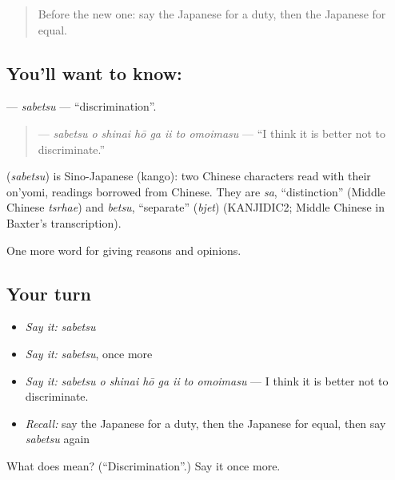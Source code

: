 \begin{quote}
Before the new one: say the Japanese for a duty, then the Japanese for equal.
\end{quote}

\subsection*{You'll want to know: }
\textbf{} — \emph{sabetsu} — \textquotedblleft{}discrimination\textquotedblright{}.

\begin{quote}
\textbf{    } — \emph{sabetsu o shinai hō ga ii to omoimasu} — \textquotedblleft{}I think it is better not to discriminate.\textquotedblright{}
\end{quote}

\begin{cousinweb}
\textbf{} (\emph{sabetsu}) is Sino-Japanese (kango): two Chinese characters read with their on'yomi, readings borrowed from Chinese. They are \emph{sa}, \textquotedblleft{}distinction\textquotedblright{} (Middle Chinese \emph{tsrhae}) and \emph{betsu}, \textquotedblleft{}separate\textquotedblright{} (\emph{bjet}) (KANJIDIC2; Middle Chinese in Baxter's transcription).
\end{cousinweb}

\begin{grammarlens}[title={What you've built}]
One more word for giving reasons and opinions.
\end{grammarlens}

\subsection*{Your turn}
\begin{itemize}
\raggedright
  \item \emph{Say it:} \emph{sabetsu}
  \item \emph{Say it:} \emph{sabetsu}, once more
  \item \emph{Say it:} \emph{sabetsu o shinai hō ga ii to omoimasu} — I think it is better not to discriminate.
  \item \emph{Recall:} say the Japanese for a duty, then the Japanese for equal, then say \emph{sabetsu} again
\end{itemize}

\begin{tcolorbox}[breakable,colback=teal!4,colframe=teal!35!black,title={Before you move on}]
What does  mean? (\textquotedblleft{}Discrimination\textquotedblright{}.) Say it once more.
\end{tcolorbox}

